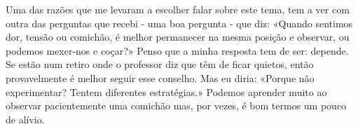 Uma das razões que me levaram a escolher falar sobre este tema, tem a
ver com outra das perguntas que recebi - uma boa pergunta - que diz:
«Quando sentimos dor, tensão ou comichão, é melhor permanecer na mesma
posição e observar, ou podemos mexer-nos e coçar?» Penso que a minha
resposta tem de ser: depende. Se estão num retiro onde o professor diz
que têm de ficar quietos, então provavelmente é melhor seguir esse
conselho. Mas eu diria: «Porque não experimentar? Tentem diferentes
\mbox{estratégias}.» Podemos aprender muito ao observar pacientemente uma
comichão mas, por vezes, é bom termos um pouco de alívio.

